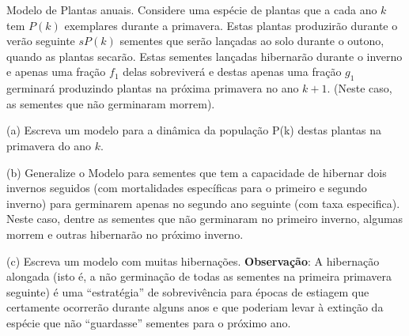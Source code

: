\begin{exercise}
Modelo de Plantas anuais. Considere uma espécie de plantas que a cada ano \(k\) tem \(P(k)\) exemplares durante a primavera. Estas plantas produzirão durante o verão seguinte \(s P(k)\) sementes que serão lançadas ao solo durante o outono, quando as plantas secarão. Estas sementes lançadas hibernarão durante o inverno e apenas uma fração \(f_1\) delas sobreviverá e destas apenas uma fração \(g_1\) germinará produzindo plantas na próxima primavera no ano \(k + 1\). (Neste caso, as sementes que não germinaram morrem).

\begin{description}
\item (a) Escreva um modelo para a dinâmica da população P(k) destas plantas na primavera do ano \(k\).
\item (b) Generalize o Modelo para sementes que tem a capacidade de hibernar dois invernos seguidos (com mortalidades específicas para o primeiro e segundo inverno) para germinarem apenas no segundo ano seguinte (com taxa especifica). Neste caso, dentre as sementes que não germinaram no primeiro inverno, algumas morrem e outras hibernarão no próximo inverno.
\item (c) Escreva um modelo com muitas hibernações.
\textbf{Observação}: A hibernação alongada (isto é, a não germinação de todas as sementes na primeira primavera seguinte) é uma ``estratégia'' de sobrevivência para épocas de estiagem que certamente ocorrerão durante alguns anos e que poderiam levar à extinção da espécie que não ``guardasse'' sementes para o próximo ano.
\end{description}
\end{exercise}

